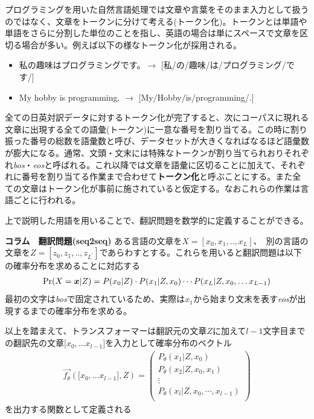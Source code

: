 プログラミングを用いた自然言語処理では文章や言葉をそのまま入力として扱うのではなく、文章をトークンに分けて考える(トークン化)。トークンとは単語や単語をさらに分割した単位のことを指し、英語の場合は単にスペースで文章を区切る場合が多い。例えば以下の様なトークン化が採用される。


\begin{itemize}
\item 私の趣味はプログラミングです。$\rightarrow$ [私/の/趣味/は/プログラミング/です/]
\item My hobby is programming. $\rightarrow$ [My/Hobby/is/programming/.]
\end{itemize}

全ての日英対訳データに対するトークン化が完了すると、次にコーパスに現れる文章に出現する全ての語彙(トークン)に一意な番号を割り当てる。この時に割り振った番号の総数を語彙数と呼び、データセットが大きくなればなるほど語彙数が膨大になる。通常、文頭・文末には特殊なトークンが割り当てられおりそれぞれ\emph{bos}・\emph{eos}と呼ばれる。これ以降では文章を語彙に区切ることに加えて、それぞれに番号を割り当てる作業まで合わせて\textbf{トークン化}と呼ぶことにする。また全ての文章はトークン化が事前に施されていると仮定する。なおこれらの作業は言語ごとに行われる。

上で説明した用語を用いることで、翻訳問題を数学的に定義することができる。

\begin{itembox}{\bf コラム　翻訳問題(seq2seq)}
  ある言語の文章を$X = [x_0, x_1, .., x_{L}]$、　別の言語の文章を$Z = [z_0, z_1, .., z_{L^\prime}]$であらわすとする。これらを用いると翻訳問題は以下の確率分布を求めることに対応する
  \begin{align}
    \Pr(X = \boldsymbol{x}|Z) = P(x_0| Z) \cdot P(x_1| Z, x_0) \cdots P(x_L| Z, x_0, \ldots x_{L-1})
  \end{align}
  最初の文字は\emph{bos}で固定されているため、実際は$x_1$から始まり文末を表す\emph{eos}が出現するまでの確率分布を求める。

  以上を踏まえて、トランスフォーマーは翻訳元の文章$Z$に加えて$l-1$文字目までの翻訳先の文章$\lbrack x_0, \ldots x_{l-1} \rbrack$を入力として確率分布のベクトル
  \begin{align}
    \label{eq:trans}
    \vec{f_\theta}(\lbrack x_0, \ldots x_{l-1} \rbrack,Z) = 
    \begin{pmatrix} 
      P_\theta(x_1 | Z, x_0)\\
      P_\theta(x_2 | Z, x_0, x_1)\\ 
      \vdots\\
      P_\theta(x_l | Z, x_0, \cdots, x_{l-1} )\\
      \end{pmatrix}
  \end{align}
  を出力する関数として定義される
\end{itembox}

